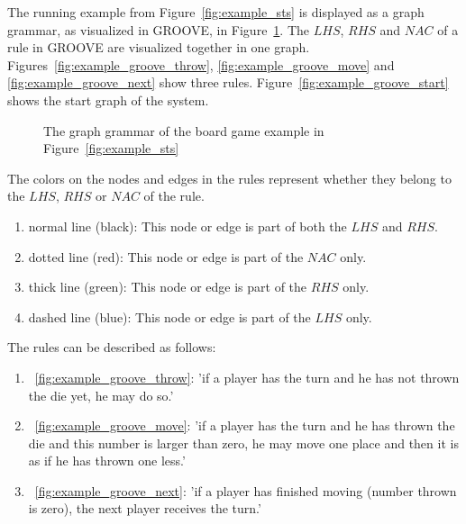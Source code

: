 The running example from Figure~\ref{fig:example_sts} is displayed as a graph grammar, as visualized in GROOVE, in Figure~\ref{fig:example_groove}. The $\mathit{LHS}$, $\mathit{RHS}$ and $\mathit{NAC}$ of a rule in GROOVE are visualized together in one graph. Figures~\ref{fig:example_groove_throw}, \ref{fig:example_groove_move} and \ref{fig:example_groove_next} show three rules. Figure~\ref{fig:example_groove_start} shows the start graph of the system.

\begin{figure}[ht]
  \begin{center}
    \quad
  \end{center}
  \caption{The graph grammar of the board game example in Figure~\ref{fig:example_sts}}
  \label{fig:example_groove}
\end{figure}

The colors on the nodes and edges in the rules represent whether they belong to the $\mathit{LHS}$, $\mathit{RHS}$ or $\mathit{NAC}$ of the rule.
\begin{enumerate}
  \item normal line (black): This node or edge is part of both the $\mathit{LHS}$ and $\mathit{RHS}$.
  \item dotted line (red): This node or edge is part of the $\mathit{NAC}$ only.
  \item thick line (green): This node or edge is part of the $\mathit{RHS}$ only.
  \item dashed line (blue): This node or edge is part of the $\mathit{LHS}$ only.
\end{enumerate}

The rules can be described as follows:
\begin{enumerate}
  \item~\ref{fig:example_groove_throw}: 'if a player has the turn and he has not thrown the die yet, he may do so.'
  \item~\ref{fig:example_groove_move}: 'if a player has the turn and he has thrown the die and this number is larger than zero, he may move one place and then it is as if he has thrown one less.'
  \item~\ref{fig:example_groove_next}: 'if a player has finished moving (number thrown is zero), the next player receives the turn.'
\end{enumerate}

